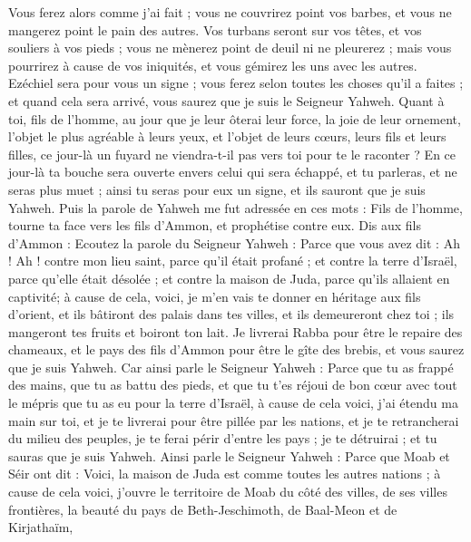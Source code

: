 \begin{multicols}{2}
Vous ferez alors comme j'ai fait ; vous ne couvrirez point vos barbes, et vous ne mangerez point le pain des autres.
Vos turbans seront sur vos têtes, et vos souliers à vos pieds ; vous ne mènerez point de deuil ni ne pleurerez ; mais vous pourrirez à cause de vos iniquités, et vous gémirez les uns avec les autres.
Ezéchiel sera pour vous un signe ; vous ferez selon toutes les choses qu'il a faites ; et quand cela sera arrivé, vous saurez que je suis le Seigneur Yahweh.
Quant à toi, fils de l’homme, au jour que je leur ôterai leur force, la joie de leur ornement, l'objet le plus agréable à leurs yeux, et l'objet de leurs cœurs, leurs fils et leurs filles,
ce jour-là un fuyard ne viendra-t-il pas vers toi pour te le raconter ?
En ce jour-là ta bouche sera ouverte envers celui qui sera échappé, et tu parleras, et ne seras plus muet ; ainsi tu seras pour eux un signe, et ils sauront que je suis Yahweh.
\VerseOne{}Puis la parole de Yahweh me fut adressée en ces mots :
Fils de l’homme, tourne ta face vers les fils d’Ammon, et prophétise contre eux.
Dis aux fils d’Ammon : Ecoutez la parole du Seigneur Yahweh : Parce que vous avez dit : Ah ! Ah ! contre mon lieu saint, parce qu'il était profané ; et contre la terre d'Israël, parce qu'elle était désolée ; et contre la maison de Juda, parce qu'ils allaient en captivité;
à cause de cela, voici, je m'en vais te donner en héritage aux fils d'orient, et ils bâtiront des palais dans tes villes, et ils demeureront chez toi ; ils mangeront tes fruits et boiront ton lait.
Je livrerai Rabba pour être le repaire des chameaux, et le pays des fils d’Ammon pour être le gîte des brebis, et vous saurez que je suis Yahweh.
Car ainsi parle le Seigneur Yahweh : Parce que tu as frappé des mains, que tu as battu des pieds, et que tu t'es réjoui de bon cœur avec tout le mépris que tu as eu pour la terre d'Israël,
à cause de cela voici, j'ai étendu ma main sur toi, et je te livrerai pour être pillée par les nations, et je te retrancherai du milieu des peuples, je te ferai périr d'entre les pays ; je te détruirai ; et tu sauras que je suis Yahweh.
Ainsi parle le Seigneur Yahweh : Parce que Moab et Séir ont dit : Voici, la maison de Juda est comme toutes les autres nations ;
à cause de cela voici, j’ouvre le territoire de Moab du côté des villes, de ses villes frontières, la beauté du pays de Beth-Jeschimoth, de Baal-Meon et de Kirjathaïm,

\end{multicols}
